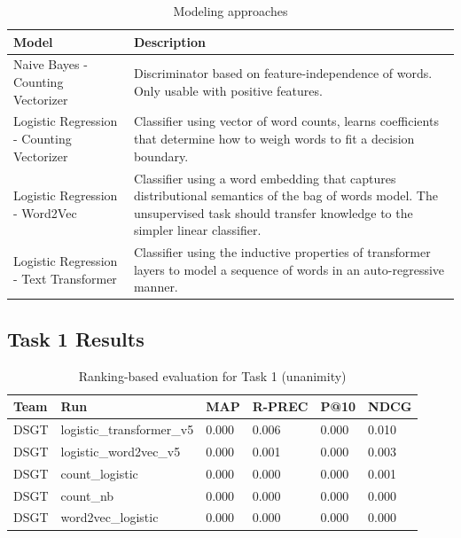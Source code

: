 \documentclass[]{style/ceurart}
\begin{document}
\begin{table}
\centering
\caption{Modeling approaches}
\renewcommand{\arraystretch}{1.2}
\begin{tabular}{p{3in}p{3in}}
\toprule
\textbf{Model} & \textbf{Description} \\ \midrule
Naive Bayes - Counting Vectorizer & Discriminator based on feature-independence of words. Only usable with positive features. \\ \midrule
Logistic Regression - Counting Vectorizer & Classifier using vector of word counts, learns coefficients that determine how to weigh words to fit a decision boundary. \\ \midrule
Logistic Regression - Word2Vec  & Classifier using a word embedding that captures distributional semantics of the bag of words model. The unsupervised task should transfer knowledge to the simpler linear classifier. \\ \midrule
Logistic Regression - Text Transformer & Classifier using the inductive properties of transformer layers to model a sequence of words in an auto-regressive manner. \\ \bottomrule
\end{tabular}
\end{table}



\subsection{Task 1 Results}

\begin{table}[]
\caption{Ranking-based evaluation for Task 1 (unanimity)}
\begin{tabular}{llllll}
Team & Run                       & MAP   & R-PREC & P@10 & NDCG  \\
\toprule
DSGT & logistic\_transformer\_v5 & 0.000 & 0.006  & 0.000                             & 0.010 \\
DSGT & logistic\_word2vec\_v5    & 0.000 & 0.001  & 0.000                             & 0.003 \\
DSGT & count\_logistic           & 0.000 & 0.000  & 0.000                             & 0.001 \\
DSGT & count\_nb                 & 0.000 & 0.000  & 0.000                             & 0.000 \\
DSGT & word2vec\_logistic        & 0.000 & 0.000  & 0.000                             & 0.000
\end{tabular}
\end{table}
\end{document}
